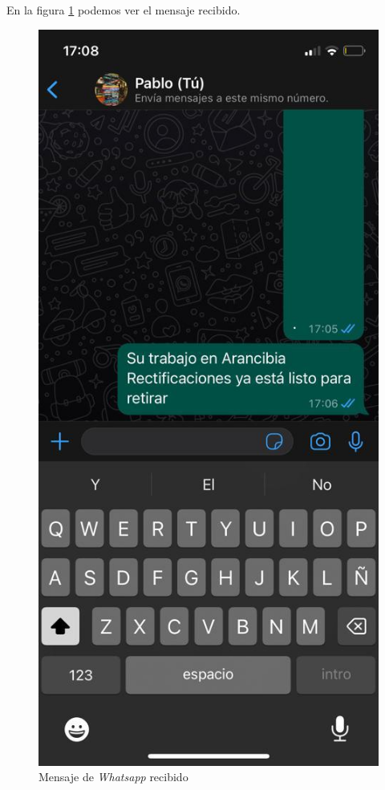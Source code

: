 En la figura \ref{fig:ensayomensajewcel2} podemos ver el mensaje recibido.

\begin{figure}[H]
	\centering
	\includegraphics[scale=.20]{./Figures/ensayo-1/15.qr-api-1.jpeg}
	\caption{Mensaje de \textit{Whatsapp} recibido}
	\label{fig:ensayomensajewcel2}
\end{figure}

